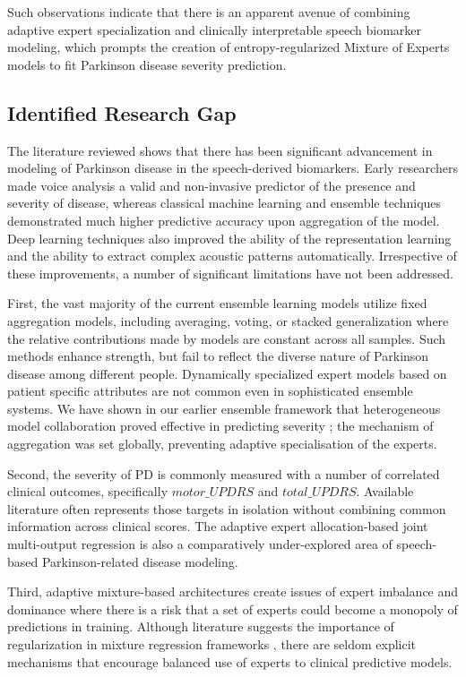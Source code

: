 \documentclass{customIEEEsingle}
\begin{document}
	Such observations indicate that there is an apparent avenue of combining adaptive expert specialization and clinically interpretable speech biomarker modeling, which prompts the creation of entropy-regularized Mixture of Experts models to fit Parkinson disease severity prediction.
	
	\subsection{Identified Research Gap}
	
	The literature reviewed shows that there has been significant advancement in modeling of Parkinson disease in the speech-derived biomarkers. Early researchers made voice analysis a valid and non-invasive predictor of the presence and severity of disease, whereas classical machine learning and ensemble techniques demonstrated much higher predictive accuracy upon aggregation of the model. Deep learning techniques also improved the ability of the representation learning and the ability to extract complex acoustic patterns automatically. Irrespective of these improvements, a number of significant limitations have not been addressed.
	
	First, the vast majority of the current ensemble learning models utilize fixed aggregation models, including averaging, voting, or stacked generalization where the relative contributions made by models are constant across all samples. Such methods enhance strength, but fail to reflect the diverse nature of Parkinson disease among different people. Dynamically specialized expert models based on patient specific attributes are not common even in sophisticated ensemble systems. We have shown in our earlier ensemble framework that heterogeneous model collaboration proved effective in predicting severity \cite{dasgupta-2025}; the mechanism of aggregation was set globally, preventing adaptive specialisation of the experts.
	
	Second, the severity of PD is commonly measured with a number of correlated clinical outcomes, specifically $motor\_UPDRS$ and $total\_UPDRS$. Available literature often represents those targets in isolation without combining common information across clinical scores. The adaptive expert allocation-based joint multi-output regression is also a comparatively under-explored area of speech-based Parkinson-related disease modeling.
	
	Third, adaptive mixture-based architectures create issues of expert imbalance and dominance where there is a risk that a set of experts could become a monopoly of predictions in training. Although literature suggests the importance of regularization in mixture regression frameworks \cite{khalili-2013}, there are seldom explicit mechanisms that encourage balanced use of experts to clinical predictive models.
	
\end{document}
